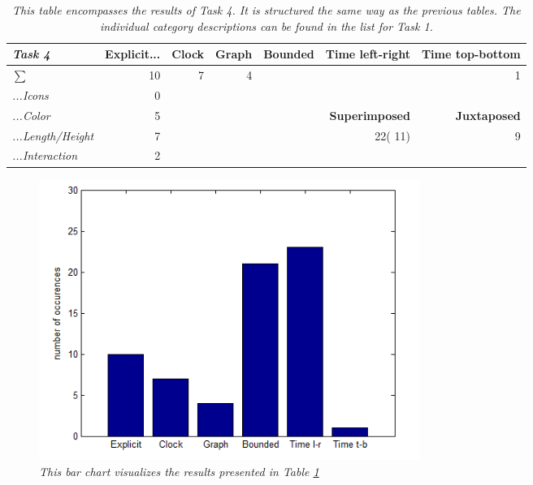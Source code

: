 \begin{table}[H]
	\centering
	\begin{tabular}{l|r|rrlrr}
		\cline{2-7}
		\textit{\textbf{Task 4}} & \multicolumn{1}{l|}{\textbf{Explicit...}} & \multicolumn{1}{l|}{\textbf{Clock}} & \multicolumn{1}{l|}{\textbf{Graph}} & \multicolumn{1}{l|}{\textbf{Bounded}} & \multicolumn{1}{l|}{\textbf{Time left-right}} & \multicolumn{1}{l|}{\textbf{Time top-bottom}} \\ \hline
		\multicolumn{1}{|l|}{\textit{$\sum$}} & \multicolumn{1}{r|}{10} & \multicolumn{1}{r|}{7} & \multicolumn{1}{r|}{4} & \multicolumn{1}{r|}{\cellcolor[HTML]{009901}{21}} & \multicolumn{1}{r|}{\cellcolor[HTML]{009901}{23}} & \multicolumn{1}{r|}{1} \\ \hline
		\multicolumn{1}{|l|}{\textit{\color[HTML]{555555}...Icons}} & 0 &  &  &  &  &  \\ \cline{1-1} \cline{2-2} \cline{6-7} 
		\multicolumn{1}{|l|}{\textit{\color[HTML]{555555}...Color}} & 5 &  &  & \multicolumn{1}{l|}{} & \multicolumn{1}{r|}{\textbf{Superimposed}} & \multicolumn{1}{r|}{\textbf{Juxtaposed}} \\ \cline{1-1} \cline{2-2} \cline{6-7} 
		\multicolumn{1}{|l|}{\textit{\color[HTML]{555555}...Length/Height}} & 7 &  &  & \multicolumn{1}{l|}{} & \multicolumn{1}{r|}{22({\color[HTML]{CB0000}  11})} & \multicolumn{1}{r|}{9} \\ \cline{1-1} \cline{2-2} \cline{6-7} 
		\multicolumn{1}{|l|}{\textit{\color[HTML]{555555}...Interaction}} & 2 &  &  & \textit{} &  &  \\ \cline{1-1} \cline{2-2}
	\end{tabular}
\caption{\textit{This table encompasses the results of Task 4. It is structured the same way as the previous tables. The individual category descriptions can be found in the list for Task 1.}}
\label{tb:t4}
\end{table}

\begin{figure}[H]
	\centering
	\includegraphics[width=0.6\textwidth]{figures/barT4.PNG}
	\caption{\textit{This bar chart visualizes the results presented in Table \ref{tb:t4}}}
	\label{fig:t4bar}
\end{figure}